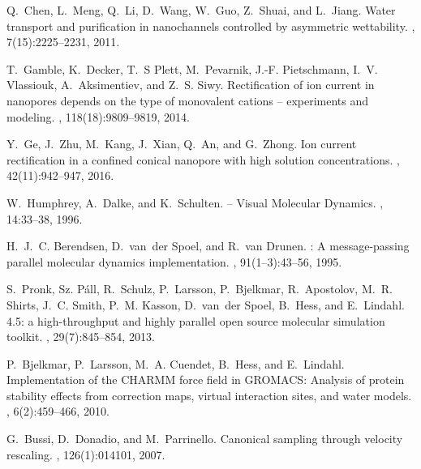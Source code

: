 \documentclass[fleqn,10pt]{SelfArx} %
\begin{document}
\begin{thebibliography}{10}
Q.~Chen, L.~Meng, Q.~Li, D.~Wang, W.~Guo, Z.~Shuai, and L.~Jiang.
\newblock Water transport and purification in nanochannels controlled by
  asymmetric wettability.
, 7(15):2225--2231, 2011.

T.~Gamble, K.~Decker, T.~S Plett, M.~Pevarnik, J.-F. Pietschmann, I.~V.
  Vlassiouk, A.~Aksimentiev, and Z.~S. Siwy.
\newblock Rectification of ion current in nanopores depends on the type of
  monovalent cations -- experiments and modeling.
, 118(18):9809--9819, 2014.

Y.~Ge, J.~Zhu, M.~Kang, J.~Xian, Q.~An, and G.~Zhong.
\newblock Ion current rectification in a confined conical nanopore with high
  solution concentrations.
, 42(11):942--947, 2016.

W.~Humphrey, A.~Dalke, and K.~Schulten.
 -- {V}isual {M}olecular {D}ynamics.
, 14:33--38, 1996.

H.~J.~C. Berendsen, D.~van~der Spoel, and R.~van Drunen.
: {A} message-passing parallel molecular dynamics
  implementation.
, 91(1--3):43--56, 1995.

S.~Pronk, Sz. P\'{a}ll, R.~Schulz, P.~Larsson, P.~Bjelkmar, R.~Apostolov, M.~R.
  Shirts, J.~C. Smith, P.~M. Kasson, D.~van~der Spoel, B.~Hess, and E.~Lindahl.
 4.5: a high-throughput and highly parallel open source
  molecular simulation toolkit.
, 29(7):845--854, 2013.

P.~Bjelkmar, P.~Larsson, M.~A. Cuendet, B.~Hess, and E.~Lindahl.
\newblock Implementation of the {CHARMM} force field in {GROMACS}: {Analysis}
  of protein stability effects from correction maps, virtual interaction sites,
  and water models.
, 6(2):459--466, 2010.

G.~Bussi, D.~Donadio, and M.~Parrinello.
\newblock Canonical sampling through velocity rescaling.
, 126(1):014101, 2007.

\end{thebibliography}

% 
%  
\end{document}
